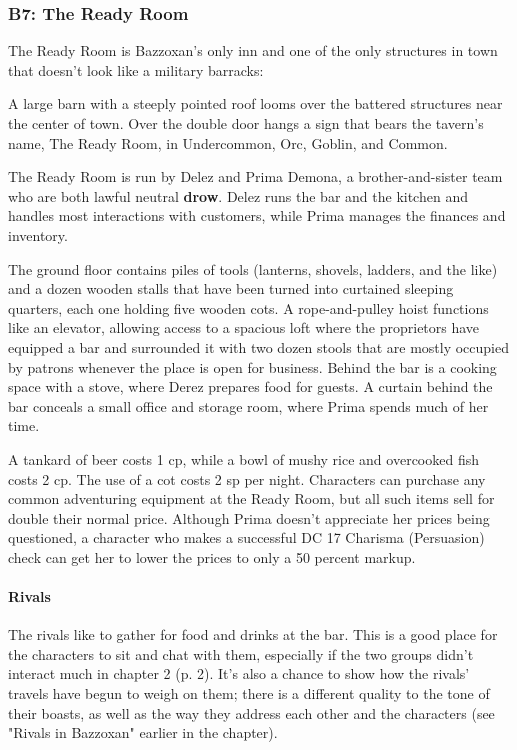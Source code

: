 \documentclass[a4paper, 11pt, bg=full, twocolumn, nooutline]{dndbook}
\begin{document}
\subsubsection{B7: The Ready Room}

The Ready Room is Bazzoxan's only inn and one of the only structures in town that doesn't look like a military barracks:

\begin{DndReadAloud}
A large barn with a steeply pointed roof looms over the battered structures near the center of town. Over the double door hangs a sign that bears the tavern's name, The Ready Room, in Undercommon, Orc, Goblin, and Common.
\end{DndReadAloud}

The Ready Room is run by Delez and Prima Demona, a brother-and-sister team who are both lawful neutral \textbf{drow}. Delez runs the bar and the kitchen and handles most interactions with customers, while Prima manages the finances and inventory.

The ground floor contains piles of tools (lanterns, shovels, ladders, and the like) and a dozen wooden stalls that have been turned into curtained sleeping quarters, each one holding five wooden cots. A rope-and-pulley hoist functions like an elevator, allowing access to a spacious loft where the proprietors have equipped a bar and surrounded it with two dozen stools that are mostly occupied by patrons whenever the place is open for business. Behind the bar is a cooking space with a stove, where Derez prepares food for guests. A curtain behind the bar conceals a small office and storage room, where Prima spends much of her time.

A tankard of beer costs 1 cp, while a bowl of mushy rice and overcooked fish costs 2 cp. The use of a cot costs 2 sp per night. Characters can purchase any common adventuring equipment at the Ready Room, but all such items sell for double their normal price. Although Prima doesn't appreciate her prices being questioned, a character who makes a successful DC 17 Charisma (Persuasion) check can get her to lower the prices to only a 50 percent markup.

\paragraph{Rivals}

The rivals like to gather for food and drinks at the bar. This is a good place for the characters to sit and chat with them, especially if the two groups didn't interact much in chapter 2 (p. 2). It's also a chance to show how the rivals' travels have begun to weigh on them; there is a different quality to the tone of their boasts, as well as the way they address each other and the characters (see "Rivals in Bazzoxan" earlier in the chapter).
\end{document}
